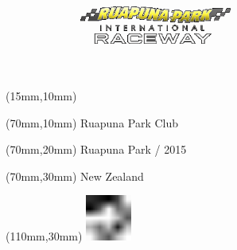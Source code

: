\null\newpage
\begin{textblock*}{50mm}(15mm,10mm)%
\includegraphics[width=50mm]{LG/RUA.png}
\end{textblock*}
\begin{textblock*}{130mm}(70mm,10mm)%
{\fontsize{20}{20}\selectfont Ruapuna Park Club}\\
\end{textblock*}
\begin{textblock*}{120mm}(70mm,20mm)%
{\fontsize{16}{16}\selectfont Ruapuna Park / 2015}\\
\end{textblock*}
\begin{textblock*}{120mm}(70mm,30mm)%
{\fontsize{12}{12}\selectfont New Zealand}
\end{textblock*}
\begin{textblock*}{30mm}(110mm,30mm)%
\centering
\includegraphics[height=15mm]{icons/fa-rotate-left.pdf}
\end{textblock*}
